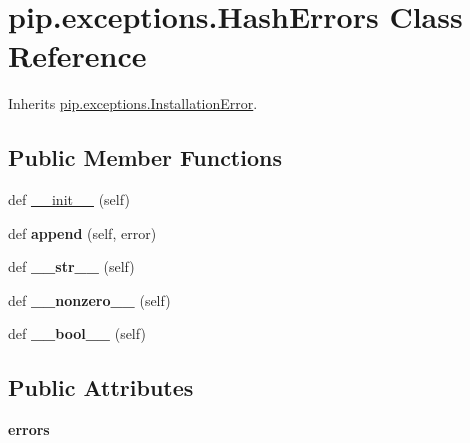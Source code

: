 \hypertarget{classpip_1_1exceptions_1_1_hash_errors}{}\section{pip.\+exceptions.\+Hash\+Errors Class Reference}
\label{classpip_1_1exceptions_1_1_hash_errors}


Inherits \hyperlink{classpip_1_1exceptions_1_1_installation_error}{pip.\+exceptions.\+Installation\+Error}.

\subsection*{Public Member Functions}
\begin{DoxyCompactItemize}
\item 
def \hyperlink{classpip_1_1exceptions_1_1_hash_errors_a447c7a4e6193a67570fdf0a2ea289659}{\+\_\+\+\_\+init\+\_\+\+\_\+} (self)
\item 
\mbox{\label{classpip_1_1exceptions_1_1_hash_errors_a4c1e5dc5bd44ab6aef64f2bae6930914}} 
def {\bfseries append} (self, error)
\item 
\mbox{\label{classpip_1_1exceptions_1_1_hash_errors_ad0426882a9655d9282cc6a75b78827ae}} 
def {\bfseries \+\_\+\+\_\+str\+\_\+\+\_\+} (self)
\item 
\mbox{\label{classpip_1_1exceptions_1_1_hash_errors_a03aeb075b694d43b30b40fbe938f803c}} 
def {\bfseries \+\_\+\+\_\+nonzero\+\_\+\+\_\+} (self)
\item 
\mbox{\label{classpip_1_1exceptions_1_1_hash_errors_a5eb5b7e1a09e49de064391b5aa6dcca4}} 
def {\bfseries \+\_\+\+\_\+bool\+\_\+\+\_\+} (self)
\end{DoxyCompactItemize}
\subsection*{Public Attributes}
\begin{DoxyCompactItemize}
\item 
\mbox{\label{classpip_1_1exceptions_1_1_hash_errors_a159e4f86824db31e35057e91248bbfb5}} 
{\bfseries errors}
\end{DoxyCompactItemize}


